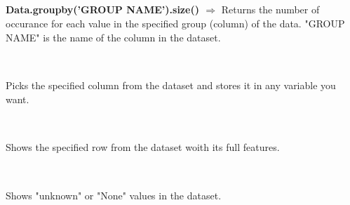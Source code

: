 \documentclass[a4paper,18pt]{article}
\begin{document}

\subsection{\colorbox {matgreen}{\color{white}{\large Data.groupby('GROUP NAME').size()}}}
\textbf{Data.groupby('GROUP NAME').size() $\Rightarrow$} Returns the number of occurance for each value in the specified group (column) of the data. "GROUP NAME" is the name of the column in the dataset.\\\\


\subsection{\colorbox {matgreen}{\color{white}{\large Data.pop('GROUP NAME')}}}
Picks the specified column from the dataset and stores it in any variable you want.\\\\


\subsection{\colorbox {matgreen}{\color{white}{\large Data.loc[index]}}}
Shows the specified row from the dataset woith its full features.\\\\


\subsection{\colorbox {matgreen}{\color{white}{\large Data.isna()}}}
Shows "unknown" or "None" values in the dataset.\\\\

\end{document}
